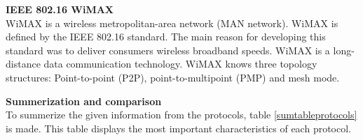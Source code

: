 \documentclass[10pt,a4paper]{article}
\begin{document}
\textbf{\large IEEE 802.16 WiMAX}\\
WiMAX is a wireless metropolitan-area network (MAN network). WiMAX is defined by the IEEE 802.16 standard. The main reason for developing this standard was to deliver consumers wireless broadband speeds. WiMAX is a long-distance data communication technology. WiMAX knows three topology structures: Point-to-point (P2P), point-to-multipoint (PMP) and mesh mode.



\textbf{\large Summerization and comparison}\\
To summerize the given information from the protocols, table \ref{sumtableprotocols} is made.
This table displays the most important characteristics of each protocol.

\begin{table}[H]
\centering
\caption{A table with a summerazing of the protocols. The table is based on information from \cite{comparitivestudywirelessprotocols}. Infrared is not included due to the line of sight problem.}
\label{sumtableprotocols}
\end{table}
\end{document}
